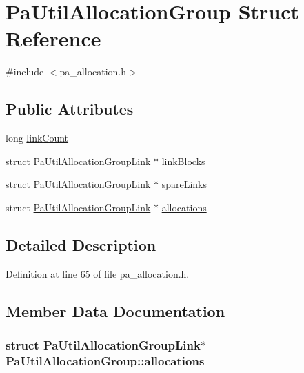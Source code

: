 \hypertarget{struct_pa_util_allocation_group}{}\section{Pa\+Util\+Allocation\+Group Struct Reference}
\label{struct_pa_util_allocation_group}


{\ttfamily \#include $<$pa\+\_\+allocation.\+h$>$}

\subsection*{Public Attributes}
\begin{DoxyCompactItemize}
\item 
long \hyperlink{struct_pa_util_allocation_group_adf2cd1d334a9703bf6aa35298bafb3cd}{link\+Count}
\item 
struct \hyperlink{struct_pa_util_allocation_group_link}{Pa\+Util\+Allocation\+Group\+Link} $\ast$ \hyperlink{struct_pa_util_allocation_group_a13cc36a8a6859cdcbb9bda370cc34f6f}{link\+Blocks}
\item 
struct \hyperlink{struct_pa_util_allocation_group_link}{Pa\+Util\+Allocation\+Group\+Link} $\ast$ \hyperlink{struct_pa_util_allocation_group_ae83b87241f68c69e41df760cd8324d58}{spare\+Links}
\item 
struct \hyperlink{struct_pa_util_allocation_group_link}{Pa\+Util\+Allocation\+Group\+Link} $\ast$ \hyperlink{struct_pa_util_allocation_group_a1df45313b17066bb431d2b79ded2ab7b}{allocations}
\end{DoxyCompactItemize}


\subsection{Detailed Description}


Definition at line 65 of file pa\+\_\+allocation.\+h.



\subsection{Member Data Documentation}
\subsubsection[{\texorpdfstring{allocations}{allocations}}]{\setlength{\rightskip}{0pt plus 5cm}struct {\bf Pa\+Util\+Allocation\+Group\+Link}$\ast$ Pa\+Util\+Allocation\+Group\+::allocations}\hypertarget{struct_pa_util_allocation_group_a1df45313b17066bb431d2b79ded2ab7b}{}\label{struct_pa_util_allocation_group_a1df45313b17066bb431d2b79ded2ab7b}


